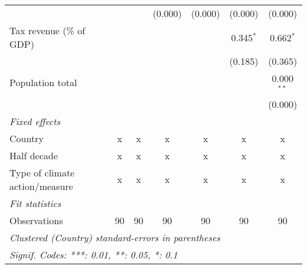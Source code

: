 \begin{tabular}{lcccccc}
                                                      &                   &                    & (0.000)            & (0.000)            & (0.000)            & (0.000)\\   
   Tax revenue (\% of GDP)                            &                   &                    &                    &                    & 0.345$^{*}$        & 0.662$^{*}$\\   
                                                      &                   &                    &                    &                    & (0.185)            & (0.365)\\   
   Population total                                   &                   &                    &                    &                    &                    & 0.000$^{**}$\\   
                                                      &                   &                    &                    &                    &                    & (0.000)\\   
   \emph{Fixed effects}\\
   Country                                            & x                 & x                  & x                  & x                  & x                  & x\\  
   Half decade                                        & x                 & x                  & x                  & x                  & x                  & x\\  
   Type of climate action/measure                     & x                 & x                  & x                  & x                  & x                  & x\\  
   \midrule \emph{Fit statistics}\\
   Observations                                       & 90                & 90                 & 90                 & 90                 & 90                 & 90\\  
   \midrule
   \multicolumn{7}{l}{\emph{Clustered (Country) standard-errors in parentheses}}\\
   \multicolumn{7}{l}{\emph{Signif. Codes: ***: 0.01, **: 0.05, *: 0.1}}\\
\end{tabular}
\par\endgroup


